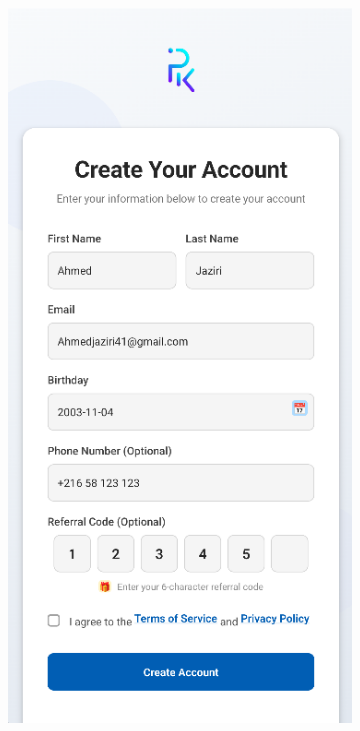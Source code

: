 \begin{figure}[htbp]
\begin{subfigure}[b]{0.3\textwidth}
        \label{fig:mobile-login}
    \end{subfigure}
    \hfill
    \begin{subfigure}[b]{0.3\textwidth}
        \centering
        \includegraphics[width=\textwidth]{images/mobile-auth-screen_signup.png}

\end{subfigure}
\end{figure}

